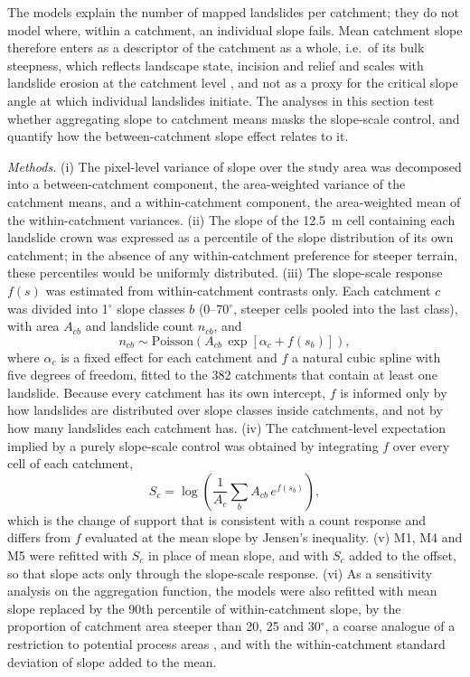 \documentclass[journal abbreviation, manuscript]{copernicus}
\begin{document}
The models explain the number of mapped landslides per catchment; they do not model where, within a catchment, an individual slope fails. Mean catchment slope therefore enters as a descriptor of the catchment as a whole, i.e.\ of its bulk steepness, which reflects landscape state, incision and relief and scales with landslide erosion at the catchment level \citep{Montgomery2002, Larsen2012}, and not as a proxy for the critical slope angle at which individual landslides initiate. The analyses in this section test whether aggregating slope to catchment means masks the slope-scale control, and quantify how the between-catchment slope effect relates to it.

\textit{Methods.} (i) The pixel-level variance of slope over the study area was decomposed into a between-catchment component, the area-weighted variance of the catchment means, and a within-catchment component, the area-weighted mean of the within-catchment variances. (ii) The slope of the 12.5~m cell containing each landslide crown was expressed as a percentile of the slope distribution of its own catchment; in the absence of any within-catchment preference for steeper terrain, these percentiles would be uniformly distributed. (iii) The slope-scale response $f(s)$ was estimated from within-catchment contrasts only. Each catchment $c$ was divided into 1$^{\circ}$ slope classes $b$ (0--70$^{\circ}$, steeper cells pooled into the last class), with area $A_{cb}$ and landslide count $n_{cb}$, and
\begin{equation}
n_{cb} \sim \mathrm{Poisson}\left(A_{cb}\, \exp\left[\alpha_c + f(s_b)\right]\right),
\end{equation}
where $\alpha_c$ is a fixed effect for each catchment and $f$ a natural cubic spline with five degrees of freedom, fitted to the 382 catchments that contain at least one landslide. Because every catchment has its own intercept, $f$ is informed only by how landslides are distributed over slope classes inside catchments, and not by how many landslides each catchment has. (iv) The catchment-level expectation implied by a purely slope-scale control was obtained by integrating $f$ over every cell of each catchment,
\begin{equation}\label{eq:Sc}
S_c = \log\left(\frac{1}{A_c}\sum_{b} A_{cb}\, e^{f(s_b)}\right),
\end{equation}
which is the change of support that is consistent with a count response and differs from $f$ evaluated at the mean slope by Jensen's inequality. (v) M1, M4 and M5 were refitted with $S_c$ in place of mean slope, and with $S_c$ added to the offset, so that slope acts only through the slope-scale response. (vi) As a sensitivity analysis on the aggregation function, the models were also refitted with mean slope replaced by the 90th percentile of within-catchment slope, by the proportion of catchment area steeper than 20, 25 and 30$^{\circ}$, a coarse analogue of a restriction to potential process areas \citep{steger2026dynamic}, and with the within-catchment standard deviation of slope added to the mean.
\end{document}
